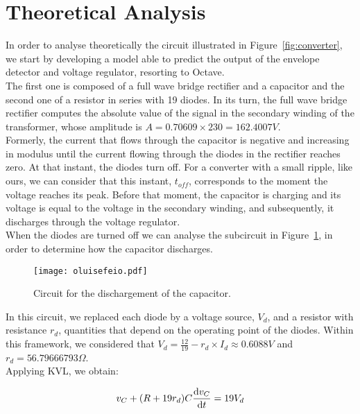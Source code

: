 \section{Theoretical Analysis}
\label{sec:analysis}

In order to analyse theoretically the circuit illustrated in Figure~\ref{fig:converter}, we start by developing a model able to predict the output of the envelope detector and voltage regulator, resorting to Octave. \\

The first one is composed of a full wave bridge rectifier and a capacitor and the second one of a resistor in series with 19 diodes. In its turn, the full wave bridge rectifier computes the absolute value of the signal in the secondary winding of the transformer, whose amplitude is $A=0.70609 \times 230=162.4007V$. \\

Formerly, the current that flows through the capacitor is negative and increasing in modulus until the current flowing through the diodes in the rectifier reaches zero. At that instant, the diodes turn off. For a converter with a small ripple, like ours, we can consider that this instant, $t_{off}$, corresponds to the moment the voltage reaches its peak. Before that moment, the capacitor is charging and its voltage is equal to the voltage in the secondary winding, and subsequently, it discharges through the voltage regulator.\\

When the diodes are turned off we can analyse the subcircuit in Figure~\ref{fig:oluisefeio}, in order to determine how the capacitor discharges.

\begin{figure}[H] \centering
\texttt{[image: oluisefeio.pdf]}
\caption{Circuit for the dischargement of the capacitor.}
\label{fig:oluisefeio}
\end{figure}

In this circuit, we replaced each diode by a voltage source, $V_d$, and a resistor with resistance $r_d$, quantities that depend on the operating point of the diodes. Within this framework, we considered that $V_d = \frac{12}{19} - r_d \times I_d \approx 0.6088 V$ and $r_d = 56.79666793 \Omega$.\\

Applying KVL, we obtain:

\begin{equation}
v_C + (R+19 r_d) C \odv{v_C}{t} = 19V_d
\end{equation}

